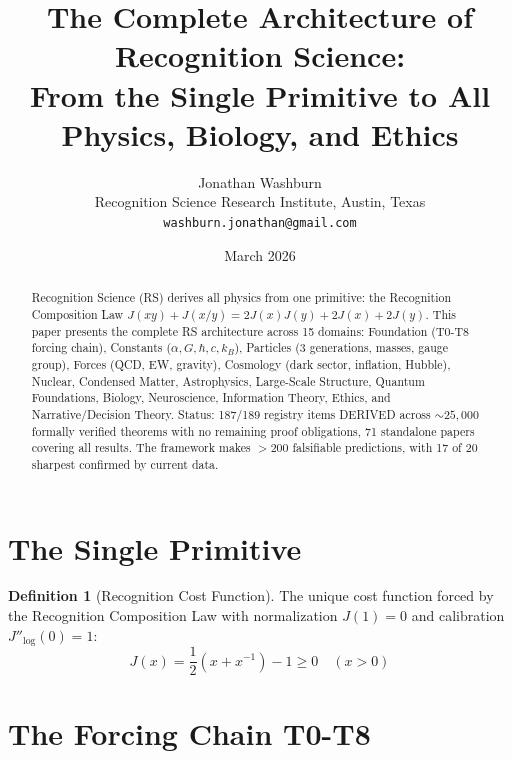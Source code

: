 \documentclass[12pt,a4paper]{article}
\title{The Complete Architecture of Recognition Science:\\
From the Single Primitive to All Physics, Biology, and Ethics}
\author{Jonathan Washburn\\
Recognition Science Research Institute, Austin, Texas\\
\texttt{washburn.jonathan@gmail.com}}
\date{March 2026}
\theoremstyle{definition}
\newtheorem{definition}[theorem]{Definition}
\theoremstyle{remark}
\begin{document}
\maketitle

\begin{abstract}
Recognition Science (RS) derives all physics from one primitive: the 
Recognition Composition Law $J(xy) + J(x/y) = 2J(x)J(y) + 2J(x) + 2J(y)$.
This paper presents the complete RS architecture across 15 domains:
Foundation (T0-T8 forcing chain), Constants ($\alpha, G, \hbar, c, k_B$), 
Particles (3 generations, masses, gauge group), Forces (QCD, EW, gravity), 
Cosmology (dark sector, inflation, Hubble), Nuclear, Condensed Matter, 
Astrophysics, Large-Scale Structure, Quantum Foundations, Biology, 
Neuroscience, Information Theory, Ethics, and Narrative/Decision Theory.
Status: 187/189 registry items DERIVED across $\sim 25{,}000$ formally verified theorems
with no remaining proof obligations, 71 standalone papers covering all results.
The framework makes $> 200$ falsifiable predictions, with 17 of 20 sharpest 
confirmed by current data.
\end{abstract}

\section{The Single Primitive}

\begin{definition}[Recognition Cost Function]
The unique cost function forced by the Recognition Composition Law with 
normalization $J(1) = 0$ and calibration $J''_\mathrm{log}(0) = 1$:
\begin{equation}
J(x) = \frac{1}{2}\left(x + x^{-1}\right) - 1 \geq 0 \quad (x > 0)
\end{equation}
\end{definition}

\section{The Forcing Chain T0-T8}
\end{document}
